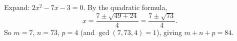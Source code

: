 Expand: $2x^2-7x-3=0$. By the quadratic formula,
\[
x=\dfrac{7\pm\sqrt{49+24}}{4}=\dfrac{7\pm\sqrt{73}}{4}.
\]
So $m=7$, $n=73$, $p=4$ (and $\gcd(7,73,4)=1$), giving $m+n+p=\boxed{84}$.
